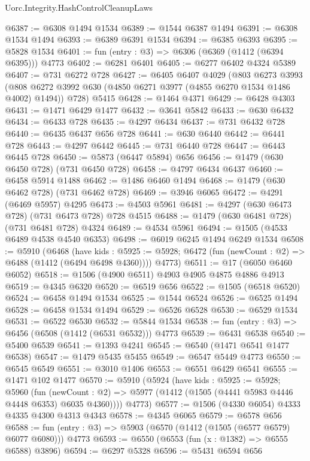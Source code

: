 \begin{lexlean}{Uorc.Integrity.HashControlCleanupLaws}
\begin{coremodule}
@6387 := @6308 @1494 @1534
@6389 := @1544 @6387 @1494
@6391 := @6308 @1534 @1494
@6393 := @6389 @6391 @1534
@6394 := @6385 @6393
@6395 := @5828 @1534
@6401 := fun (entry : @3) => @6306 (@6369 (@1412 (@6394 @6395))) @4773
@6402 := @6281 @6401
@6405 := @6277 @6402 @4324 @5389
@6407 := @731 @6272 @728
@6427 := @6405
    @6407
    @4029
    (@803
      @6273
      @3993
      (@808 @6272 @3992 @630 (@4850 @6271 @3977 (@4855 @6270 @1534 @1486 @4002) @1494))
      @728)
    @5415
@6428 := @1464 @4371
@6429 := @6428 @4303
@6431 := @1471 @6429 @1477
@6432 := @3641 @5842
@6433 := @630 @6432
@6434 := @6433 @728
@6435 := @4297 @6434
@6437 := @731 @6432 @728
@6440 := @6435 @6437 @656 @728
@6441 := @630 @6440
@6442 := @6441 @728
@6443 := @4297 @6442
@6445 := @731 @6440 @728
@6447 := @6443 @6445 @728
@6450 := @5873 (@6447 @5894) @656
@6456 := @1479 (@630 @6450 @728) (@731 @6450 @728)
@6458 := @4797 @6434 @6437
@6460 := @6458 @5914 @1488
@6462 := @1486 @6460 @1494
@6468 := @1479 (@630 @6462 @728) (@731 @6462 @728)
@6469 := @3946 @6065
@6472 := @4291 (@6469 @5957) @4295
@6473 := @4503 @5961
@6481 := @4297 (@630 @6473 @728) (@731 @6473 @728) @728 @4515
@6488 := @1479 (@630 @6481 @728) (@731 @6481 @728) @4324
@6489 := @4534 @5961
@6494 := @1505 (@4533 @6489 @4538 @4540 @6353)
@6498 := @6019 @6245 @1494 @6249 @1534
@6508 := @5910
    (@6468
      (have kids : @5925 := @5928; @6472 (fun (newCount : @2) => @6488 (@1412 (@6494 @6498 @4360))))
      @4773)
@6511 := @17 (@6050 @6460 @6052)
@6518 := @1506 (@4900 @6511) @4903 @4905 @4875 @4886 @4913
@6519 := @4345 @6320
@6520 := @6519 @656
@6522 := @1505 (@6518 @6520)
@6524 := @6458 @1494 @1534
@6525 := @1544 @6524
@6526 := @6525 @1494
@6528 := @6458 @1534 @1494
@6529 := @6526 @6528
@6530 := @6529 @1534
@6531 := @6522 @6530
@6532 := @5844 @1534
@6538 := fun (entry : @3) => @6456 (@6508 (@1412 (@6531 @6532))) @4773
@6539 := @6431 @6538
@6540 := @5400 @6539
@6541 := @1393 @4241
@6545 := @6540 (@1471 @6541 @1477 @6538)
@6547 := @1479 @5435 @5455
@6549 := @6547 @5449 @4773
@6550 := @6545 @6549
@6551 := @3010 @1406
@6553 := @6551 @6429 @6541
@6555 := @1471 @102 @1477
@6570 := @5910
    (@5924
      (have kids : @5925 := @5928;
      @5960
        (fun (newCount : @2) => @5977 (@1412 (@1505 (@4441 @5983 @4446 @4448 @6353) @6035 @4360))))
      @4773)
@6577 := @1506 (@4330 @6054) @4333 @4335 @4300 @4313 @4343
@6578 := @4345 @6065
@6579 := @6578 @656
@6588 := fun (entry : @3) => @5903 (@6570 (@1412 (@1505 (@6577 @6579) @6077 @6080))) @4773
@6593 := @6550 (@6553 (fun (x : @1382) => @6555 @6588) @3896)
@6594 := @6297 @5328
@6596 := @5431 @6594 @656

\end{coremodule}
\end{lexlean}
